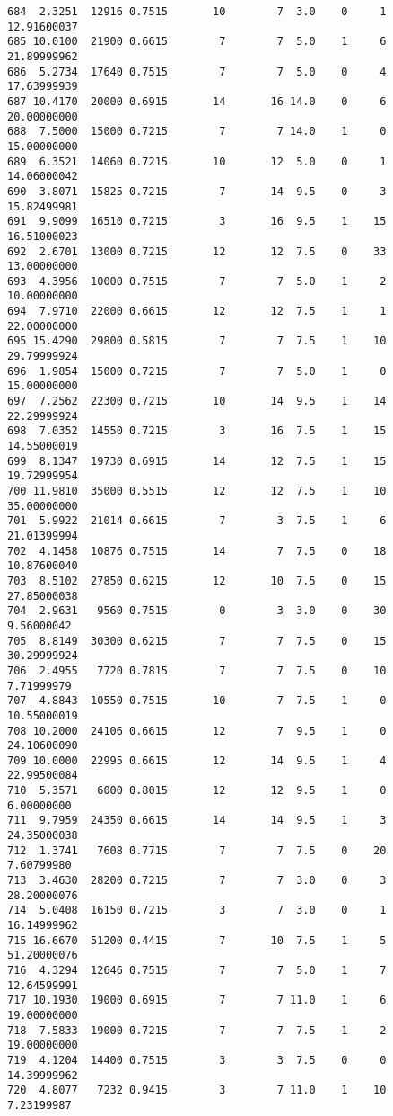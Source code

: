 \documentclass[
  letterpaper,
  DIV=11,
  numbers=noendperiod]{scrreprt}
\begin{document}
\begin{verbatim}
684  2.3251  12916 0.7515       10        7  3.0    0     1 12.91600037
685 10.0100  21900 0.6615        7        7  5.0    1     6 21.89999962
686  5.2734  17640 0.7515        7        7  5.0    0     4 17.63999939
687 10.4170  20000 0.6915       14       16 14.0    0     6 20.00000000
688  7.5000  15000 0.7215        7        7 14.0    1     0 15.00000000
689  6.3521  14060 0.7215       10       12  5.0    0     1 14.06000042
690  3.8071  15825 0.7215        7       14  9.5    0     3 15.82499981
691  9.9099  16510 0.7215        3       16  9.5    1    15 16.51000023
692  2.6701  13000 0.7215       12       12  7.5    0    33 13.00000000
693  4.3956  10000 0.7515        7        7  5.0    1     2 10.00000000
694  7.9710  22000 0.6615       12       12  7.5    1     1 22.00000000
695 15.4290  29800 0.5815        7        7  7.5    1    10 29.79999924
696  1.9854  15000 0.7215        7        7  5.0    1     0 15.00000000
697  7.2562  22300 0.7215       10       14  9.5    1    14 22.29999924
698  7.0352  14550 0.7215        3       16  7.5    1    15 14.55000019
699  8.1347  19730 0.6915       14       12  7.5    1    15 19.72999954
700 11.9810  35000 0.5515       12       12  7.5    1    10 35.00000000
701  5.9922  21014 0.6615        7        3  7.5    1     6 21.01399994
702  4.1458  10876 0.7515       14        7  7.5    0    18 10.87600040
703  8.5102  27850 0.6215       12       10  7.5    0    15 27.85000038
704  2.9631   9560 0.7515        0        3  3.0    0    30  9.56000042
705  8.8149  30300 0.6215        7        7  7.5    0    15 30.29999924
706  2.4955   7720 0.7815        7        7  7.5    0    10  7.71999979
707  4.8843  10550 0.7515       10        7  7.5    1     0 10.55000019
708 10.2000  24106 0.6615       12        7  9.5    1     0 24.10600090
709 10.0000  22995 0.6615       12       14  9.5    1     4 22.99500084
710  5.3571   6000 0.8015       12       12  9.5    1     0  6.00000000
711  9.7959  24350 0.6615       14       14  9.5    1     3 24.35000038
712  1.3741   7608 0.7715        7        7  7.5    0    20  7.60799980
713  3.4630  28200 0.7215        7        7  3.0    0     3 28.20000076
714  5.0408  16150 0.7215        3        7  3.0    0     1 16.14999962
715 16.6670  51200 0.4415        7       10  7.5    1     5 51.20000076
716  4.3294  12646 0.7515        7        7  5.0    1     7 12.64599991
717 10.1930  19000 0.6915        7        7 11.0    1     6 19.00000000
718  7.5833  19000 0.7215        7        7  7.5    1     2 19.00000000
719  4.1204  14400 0.7515        3        3  7.5    0     0 14.39999962
720  4.8077   7232 0.9415        3        7 11.0    1    10  7.23199987

\end{verbatim}
\end{document}
